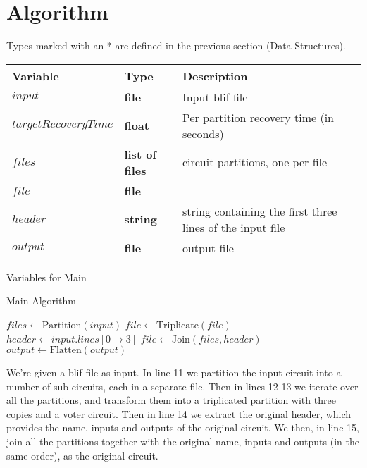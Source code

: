 \documentclass[12pt,final,oneside]{article} %
\begin{document}
\section{Algorithm}
Types marked with an * are defined in the previous section (Data Structures).
\begin{algorithm}
    \begin{center}
        \begin{tabular}{lll}
        \toprule
        Variable & Type & Description\\
        \midrule
        $input$ & \bf{file} & Input blif file\\
        $targetRecoveryTime$ & \bf{float} & Per partition recovery time (in seconds) \\
        $files$ & \bf{list} of \bf{file}s & circuit partitions, one per file \\
        $file$ & \bf{file} & \\
        $header$ & \bf{string} & string containing the first three lines of the input file \\
        $output$ & \bf{file} & output file\\
        \bottomrule
        \end{tabular}
        \caption{Variables for Main}
        \label{varMain}
    \end{center}
   \caption{Main Algorithm}\label{main}
   \begin{algorithmic}[1]
         \State $files \gets \mbox{Partition}(input)$
            \State $file \gets \mbox{Triplicate}(file)$
         \EndFor
         \State $header \gets input.lines[0\to 3]$
         \State $file \gets \mbox{Join}(files, header)$
         \State $output \gets \mbox{Flatten}(output)$
      \EndProcedure
   \end{algorithmic}
\end{algorithm}
We're given a blif file as input.
In line 11 we partition the input circuit into a number of sub circuits, each in a separate file.
Then in lines 12-13 we iterate over all the partitions, and transform them into a triplicated partition with three copies and a voter circuit.
Then in line 14 we extract the original header, which provides the name, inputs and outputs of the original circuit.
We then, in line 15, join all the partitions together with the original name, inputs and outputs (in the same order), as the original circuit.
\newpage
\end{document}
